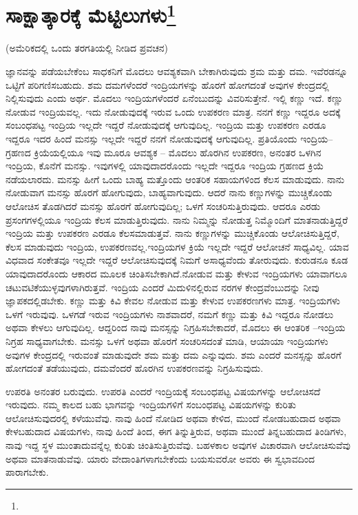 
\chapter[ಸಾಕ್ಷಾತ್ಕಾರಕ್ಕೆ ಮೆಟ್ಟಿಲುಗಳು]{ಸಾಕ್ಷಾತ್ಕಾರಕ್ಕೆ ಮೆಟ್ಟಿಲುಗಳು\protect\footnote{}}

\begin{center}
(ಅಮೆರಿಕದಲ್ಲಿ ಒಂದು ತರಗತಿಯಲ್ಲಿ ನೀಡಿದ ಪ್ರವಚನ)
\end{center}

ಜ್ಞಾನವನ್ನು ಪಡೆಯಬೇಕೆಂಬ ಸಾಧಕನಿಗೆ ಮೊದಲು ಆವಶ್ಯಕವಾಗಿ ಬೇಕಾಗಿರುವುದು ಶ್ರಮ ಮತ್ತು ದಮ. ಇವೆರಡನ್ನೂ ಒಟ್ಟಿಗೆ ಪರಿಗಣಿಸಬಹುದು. ಶಮ ದಮಗಳೆಂದರೆ ಇಂದ್ರಿಯಗಳನ್ನು ಹೊರಗೆ ಹೋಗದಂತೆ ಅವುಗಳ ಕೇಂದ್ರದಲ್ಲಿ ನಿಲ್ಲಿಸುವುದು ಎಂದು ಅರ್ಥ. ಮೊದಲು ಇಂದ್ರಿಯಗಳೆಂದರೆ ಏನೆಂಬುದನ್ನು ವಿವರಿಸುತ್ತೇನೆ. ಇಲ್ಲಿ ಕಣ್ಣು ಇದೆ. ಕಣ್ಣು ನೋಡುವ ಇಂದ್ರಿಯವಲ್ಲ. ಇದು ನೋಡುವುದಕ್ಕೆ ಇರುವ ಒಂದು ಉಪಕರಣ ಮಾತ್ರ. ನನಗೆ ಕಣ್ಣು ಇದ್ದರೂ ಅದಕ್ಕೆ ಸಂಬಂಧಪಟ್ಟ ಇಂದ್ರಿಯ ಇಲ್ಲದೇ ಇದ್ದರೆ ನೋಡುವುದಕ್ಕೆ ಆಗುವುದಿಲ್ಲ. ಇಂದ್ರಿಯ ಮತ್ತು ಉಪಕರಣ ಎರಡೂ ಇದ್ದರೂ ಇದರ ಹಿಂದೆ ಮನಸ್ಸು ಇಲ್ಲದೇ ಇದ್ದರೆ ನನಗೆ ನೋಡುವುದಕ್ಕೆ ಆಗುವುದಿಲ್ಲ. ಪ್ರತಿಯೊಂದು ಇಂದ್ರಿಯ–ಗ್ರಹಣದ ಕ್ರಿಯೆಯಲ್ಲಿಯೂ ಇವು ಮೂರೂ ಆವಶ್ಯಕ – ಮೊದಲು ಹೊರಗಿನ ಉಪಕರಣ, ಅನಂತರ ಒಳಗಿನ ಇಂದ್ರಿಯ, ಕೊನೆಗೆ ಮನಸ್ಸು. ಇವುಗಳಲ್ಲಿ ಯಾವುದಾದರೊಂದು ಇಲ್ಲದೇ ಇದ್ದರೂ ಇಂದ್ರಿಯ ಗ್ರಹಣದ ಕ್ರಿಯೆ ನಡೆಯಲಾರದು. ಮನಸ್ಸು ಹೀಗೆ ಒಂದು ಬಾಹ್ಯ ಮತ್ತೊಂದು ಆಂತರಿಕ ಸಹಾಯಗಳಿಂದ ಕೆಲಸ ಮಾಡುವುದು. ನಾನು ನೋಡುವಾಗ ಮನಸ್ಸು ಹೊರಗೆ ಹೋಗುವುದು, ಬಾಹ್ಯವಾಗುವುದು. ಆದರೆ ನಾನು ಕಣ್ಣುಗಳನ್ನು ಮುಚ್ಚಿಕೊಂಡು ಆಲೋಚಿಸ ತೊಡಗಿದರೆ ಮನಸ್ಸು ಹೊರಗೆ ಹೋಗುವುದಿಲ್ಲ; ಒಳಗೆ ಸಂಚರಿಸುತ್ತಿರುವುದು. ಆದರೂ ಎರಡು ಪ್ರಸಂಗಗಳಲ್ಲಿಯೂ ಇಂದ್ರಿಯ ಕೆಲಸ ಮಾಡುತ್ತಿರುವುದು. ನಾನು ನಿಮ್ಮನ್ನು ನೋಡುತ್ತ ನಿಮ್ಮೊಂದಿಗೆ ಮಾತನಾಡುತ್ತಿದ್ದರೆ ಇಂದ್ರಿಯ ಮತ್ತು ಉಪಕರಣ ಎರಡೂ ಕೆಲಸಮಾಡುತ್ತವೆ. ನಾನು ಕಣ್ಣುಗಳನ್ನು ಮುಚ್ಚಿಕೊಂಡು ಆಲೋಚಿಸುತ್ತಿದ್ದರೆ, ಕೆಲಸ ಮಾಡುವುದು ಇಂದ್ರಿಯ, ಉಪಕರಣವಲ್ಲ.\break ಇಂದ್ರಿಯಗಳ ಕ್ರಿಯೆ ಇಲ್ಲದೇ ಇದ್ದರೆ ಆಲೋಚನೆ ಸಾಧ್ಯವಿಲ್ಲ. ಯಾವ ವಿಧವಾದ ಸಂಕೇತವೂ ಇಲ್ಲದೇ ಇದ್ದರೆ ಆಲೋಚಿಸುವುದಕ್ಕೆ ನಿಮಗೆ ಅಸಾಧ್ಯವೆಂದು ತೋರುವುದು. ಕುರುಡನೂ ಕೂಡ ಯಾವುದಾದರೊಂದು ಆಕಾರದ ಮೂಲಕ ಚಿಂತಿಸಬೇಕಾಗಿದೆ.\break ನೋಡುವ ಮತ್ತು ಕೇಳುವ ಇಂದ್ರಿಯಗಳು ಯಾವಾಗಲೂ ಚಟುವಟಿಕೆಯುಳ್ಳವುಗಳಾಗಿರುತ್ತವೆ. ಇಂದ್ರಿಯ ಎಂದರೆ ಮಿದುಳಿನಲ್ಲಿರುವ ನರಗಳ ಕೇಂದ್ರವೆಂಬುದನ್ನು ನೀವು ಜ್ಞಾಪಕದಲ್ಲಿಡಬೇಕು. ಕಣ್ಣು ಮತ್ತು ಕಿವಿ ಕೇವಲ ನೋಡುವ ಮತ್ತು ಕೇಳುವ ಉಪಕರಣಗಳು ಮಾತ್ರ. ಇಂದ್ರಿಯಗಳು ಒಳಗೆ ಇರುವುವು. ಒಳಗಡೆ ಇರುವ ಇಂದ್ರಿಯಗಳು ನಾಶವಾದರೆ, ನಮಗೆ ಕಣ್ಣು ಮತ್ತು ಕಿವಿ ಇದ್ದರೂ ನೋಡಲು ಅಥವಾ ಕೇಳಲು ಆಗುವುದಿಲ್ಲ. ಆದ್ದರಿಂದ ನಾವು ಮನಸ್ಸನ್ನು ನಿಗ್ರಹಿಸಬೇಕಾದರೆ, ಮೊದಲು ಈ ಆಂತರಿಕ –ಇಂದ್ರಿಯ ನಿಗ್ರಹ ಸಾಧ್ಯವಾಗಬೇಕು. ಮನಸ್ಸು ಒಳಗೆ ಅಥವಾ ಹೊರಗೆ ಸಂಚರಿಸದಂತೆ ಮಾಡಿ, ಆಯಾಯಾ ಇಂದ್ರಿಯಗಳು ಅವುಗಳ ಕೇಂದ್ರದಲ್ಲಿ ಇರುವಂತೆ ಮಾಡುವುದೇ ಶಮ ಮತ್ತು ದಮ ಎನ್ನುವುದು. ಶಮ ಎಂದರೆ ಮನಸ್ಸನ್ನು ಹೊರಗೆ ಹೋಗದಂತೆ ತಡೆಯುವುದು, ದಮವೆಂದರೆ ಹೊರಗಿನ ಉಪಕರಣವನ್ನು ನಿಗ್ರಹಿಸುವುದು.

ಉಪರತಿ ಅನಂತರ ಬರುವುದು. ಉಪರತಿ ಎಂದರೆ ಇಂದ್ರಿಯಕ್ಕೆ ಸಂಬಂಧಪಟ್ಟ ವಿಷಯಗಳನ್ನು ಆಲೋಚಿಸದೆ ಇರುವುದು. ನಮ್ಮ ಕಾಲದ ಬಹು ಭಾಗವನ್ನು ಇಂದ್ರಿಯಗಳಿಗೆ ಸಂಬಂಧಪಟ್ಟ ವಿಷಯಗಳನ್ನು ಕುರಿತು ಆಲೋಚಿಸುವುದರಲ್ಲಿ ಕಳೆಯುವೆವು. ನಾವು ಹಿಂದೆ ನೋಡಿದ ಅಥವಾ ಕೇಳಿದ, ಮುಂದೆ ನೋಡಬಹುದಾದ ಅಥವಾ ಕೇಳಬಹುದಾದ ವಿಷಯಗಳು, ನಾವು ಹಿಂದೆ ತಿಂದ, ಈಗ ತಿನ್ನುತ್ತಿರುವ, ಅಥವಾ ಮುಂದೆ ತಿನ್ನಬಹುದಾದ ತಿಂಡಿಗಳು, ನಾವು ಇದ್ದ ಸ್ಥಳ ಮುಂತಾದುವನ್ನೆಲ್ಲ ಕುರಿತು ಚಿಂತಿಸುತ್ತಿರುವೆವು. ಬಹಳಕಾಲ ಅವುಗಳ ವಿಚಾರವಾಗಿ ಆಲೋಚಿಸುವೆವು ಅಥವಾ ಮಾತನಾಡುವೆವು. ಯಾರು ವೇದಾಂತಿಗಳಾಗಬೇಕೆಂದು ಬಯಸುವರೋ ಅವರು ಈ ಸ್ವಭಾವದಿಂದ ಪಾರಾಗಬೇಕು.

